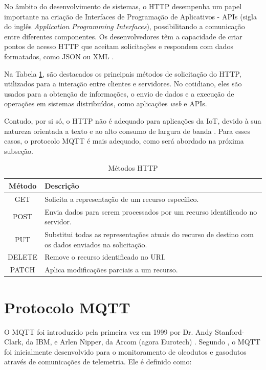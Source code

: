 No âmbito do desenvolvimento de sistemas, o HTTP desempenha um papel importante na criação de Interfaces de Programação de Aplicativos - APIs (sigla do inglês \textit{Application Programming Interfaces}), possibilitando a comunicação entre diferentes componentes. Os desenvolvedores têm a capacidade de criar pontos de acesso HTTP que aceitam solicitações e respondem com dados formatados, como JSON ou XML \parencite{Newmann_web}.

Na Tabela \ref{tab:metodos_http}, são destacados os principais métodos de solicitação do HTTP, utilizados para a interação entre clientes e servidores. No cotidiano, eles são usados para a obtenção de informações, o envio de dados e a execução de operações em sistemas distribuídos, como aplicações \textit{web} e APIs.

Contudo, por si só, o HTTP não é adequado para aplicações da IoT, devido à sua natureza orientada a texto e ao alto consumo de largura de banda \parencite{Yassein_mqtt2017}. Para esses casos, o protocolo MQTT é mais adequado, como será abordado na próxima subseção.

\begin{table}[!htb]
  \caption{Métodos HTTP} \label{tab:metodos_http}
  \begin{tabularx}{\textwidth}{|c|X|} \hline
    \textbf{Método} & \textbf{Descrição} \\ \hline
    GET & Solicita a representação de um recurso específico. \\ \hline
    POST & Envia dados para serem processados por um recurso identificado no servidor. \\ \hline
    PUT & Substitui todas as representações atuais do recurso de destino com os dados enviados na solicitação. \\ \hline
    DELETE & Remove o recurso identificado no URI. \\ \hline
    PATCH & Aplica modificações parciais a um recurso. \\ \hline  
  \end{tabularx}
\end{table}

\section{Protocolo MQTT}

O MQTT foi introduzido pela primeira vez em 1999 por Dr. Andy Stanford-Clark, da IBM, e Arlen Nipper, da Arcom (agora Eurotech) \parencite{Yassein_mqtt2017}. Segundo \textcite{Andy_mqtt2004}, o MQTT foi inicialmente desenvolvido para o monitoramento de oleodutos e gasodutos através de comunicações de telemetria. Ele é definido como:

